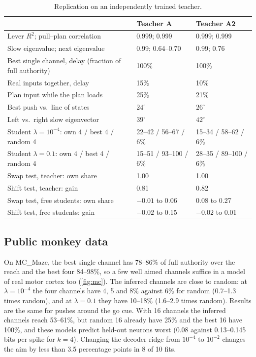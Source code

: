 \documentclass[11pt,a4paper]{article}
\begin{document}
\begin{table}[t]
  \centering
  \caption{Replication on an independently trained teacher.}
  \label{tab:rep}
  \small
  \begin{tabularx}{\linewidth}{@{}Xll@{}}
    \toprule
    & Teacher A & Teacher A2 \\
    \midrule
    Lever $R^2$; pull--plan correlation & 0.999; 0.999 & 0.999; 0.999 \\
    Slow eigenvalue; next eigenvalue & 0.99; 0.64--0.70 & 0.99; 0.76 \\
    Best single channel, delay (fraction of full authority) & 100\% & 100\% \\
    Real inputs together, delay & 15\% & 10\% \\
    Plan input while the plan loads & 25\% & 21\% \\
    Best push vs.\ line of states & $24^\circ$ & $26^\circ$ \\
    Left vs.\ right slow eigenvector & $39^\circ$ & $42^\circ$ \\
    Student $\lambda=10^{-4}$: own 4 / best 4 / random 4 & 22--42 / 56--67 / 6\% & 15--34 / 58--62 / 6\% \\
    Student $\lambda=0.1$: own 4 / best 4 / random 4 & 15--51 / 93--100 / 6\% & 28--35 / 89--100 / 6\% \\
    Swap test, teacher: own share & 1.00 & 1.00 \\
    Shift test, teacher: gain & 0.81 & 0.82 \\
    Swap test, free students: own share & $-0.01$ to 0.06 & 0.08 to 0.27 \\
    Shift test, free students: gain & $-0.02$ to 0.15 & $-0.02$ to 0.01 \\
    \bottomrule
  \end{tabularx}
\end{table}

\subsection{Public monkey data}\label{sec:res-mc}

On MC\_Maze, the best single channel has 78--86\% of full authority over the reach and the best four 84--98\%, so a few well aimed channels suffice in a model of real motor cortex too (\cref{fig:mc}). The inferred channels are close to random: at $\lambda=10^{-4}$ the four channels have 4, 5 and 8\% against 6\% for random (0.7--1.3 times random), and at $\lambda=0.1$ they have 10--18\% (1.6--2.9 times random). Results are the same for pushes around the go cue. With 16 channels the inferred channels reach 53--61\%, but random 16 already have 25\% and the best 16 have 100\%, and these models predict held-out neurons worst (0.08 against 0.13--0.145 bits per spike for $k=4$). Changing the decoder ridge from $10^{-4}$ to $10^{-2}$ changes the aim by less than 3.5 percentage points in 8 of 10 fits.
\end{document}

